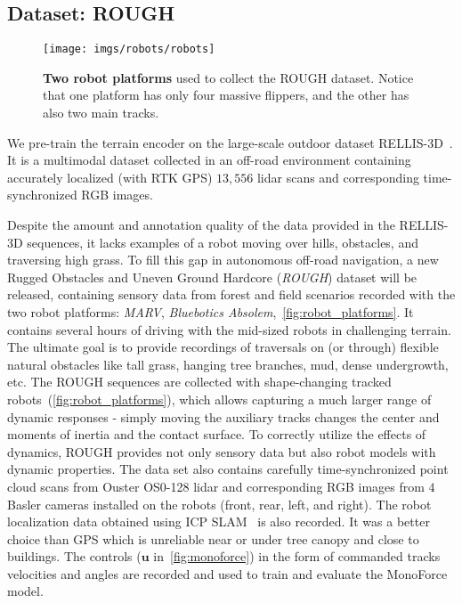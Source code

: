 \subsection{Dataset: ROUGH}\label{subsec:rough_data}
\begin{figure}
    \centering
    \texttt{[image: imgs/robots/robots]}
    \caption{\textbf{Two robot platforms} used to collect the ROUGH dataset. Notice that one platform has only four massive flippers, and the other has also two main tracks.}
    \label{fig:robot_platforms}
\end{figure}
We pre-train the terrain encoder on the large-scale outdoor dataset RELLIS-3D~\cite{jiang2020rellis3d}.
It is a multimodal dataset collected in an off-road environment containing accurately localized (with RTK GPS)
$13,556$ lidar scans and corresponding time-synchronized RGB images.

Despite the amount and annotation quality of the data provided in the RELLIS-3D sequences,
it lacks examples of a robot moving over hills, obstacles, and traversing high grass.
To fill this gap in autonomous off-road navigation, a new
Rugged Obstacles and Uneven Ground Hardcore (\emph{ROUGH}) dataset will be released,
containing sensory data from forest and field scenarios recorded with the two robot platforms:
\textit{MARV}, \textit{Bluebotics Absolem},~\autoref{fig:robot_platforms}.
It contains several hours of driving with the mid-sized robots in challenging terrain.
The ultimate goal is to provide recordings of traversals on (or through) flexible natural obstacles like tall grass,
hanging tree branches, mud, dense undergrowth, etc.
The ROUGH sequences are collected with shape-changing tracked robots~(\autoref{fig:robot_platforms}),
which allows capturing a much larger range of dynamic responses - simply moving the auxiliary tracks
changes the center and moments of inertia and the contact surface.
To correctly utilize the effects of dynamics,
ROUGH provides not only sensory data but also robot models with dynamic properties.
The data set also contains carefully time-synchronized point cloud scans from Ouster OS0-128 lidar and corresponding RGB images
from $4$ Basler cameras installed on the robots (front, rear, left, and right).
The robot localization data obtained using ICP SLAM~\cite{Pomerleau-2013-AR} is also recorded.
It was a better choice than GPS which is unreliable near or under tree canopy and close to buildings.
The controls ($\mathbf{u}$ in~\autoref{fig:monoforce}) in the form of commanded tracks velocities and angles
are recorded and used to train and evaluate the MonoForce model.

